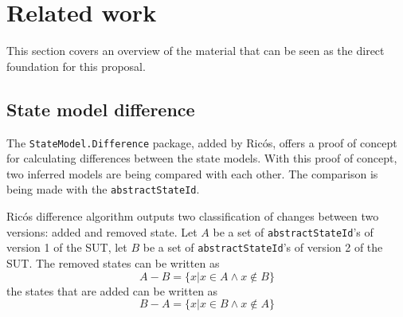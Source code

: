 \section{Related work} \label{releatedWork}
    
    This section covers an overview of the material that can be seen as the direct foundation for this proposal.
    
    
    
    
        

        
        
\subsection{State model difference}
The \verb|StateModel.Difference| package, added by Ricós\cite{stateDiff}, offers a proof of concept for calculating differences between the state models. With this proof of concept, two inferred models are being compared with each other. The comparison is being made with the \verb|abstractStateId|. 

Ricós difference algorithm\cite{stateDiff} outputs two classification of changes between two versions: added and removed state. Let $A$ be a set of \verb|abstractStateId|'s of version 1 of the SUT, let $B$ be a set of \verb|abstractStateId|'s of version 2 of the SUT. The removed states can be written as
\[A-B = \lbrace x | x \in A \wedge x \notin B \rbrace\]
the states that are added can be written as
\[B-A = \lbrace x | x \in B \wedge x \notin A \rbrace\]


